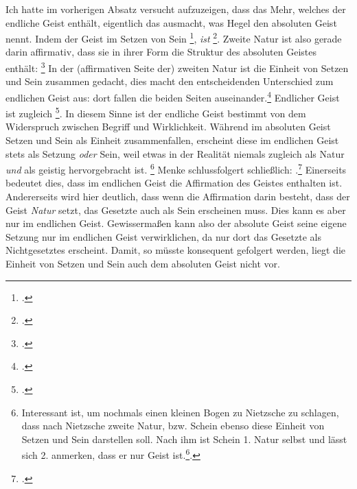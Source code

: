 \documentclass[12pt, a4paper, openany]{report}
\begin{document}
Ich hatte im vorherigen Absatz versucht aufzuzeigen, dass das Mehr, welches der endliche Geist enthält, eigentlich das ausmacht, was Hegel den absoluten Geist nennt.
Indem der Geist im Setzen von Sein \footcite[][§ 384, S. 29]{hegel_enzyklopädie_1969}, \emph{ist} \footcite[][144]{menke_autonomie_2018}.
Zweite Natur ist also gerade darin affirmativ, dass sie in ihrer Form die Struktur des absoluten Geistes enthält: 
\footcite[][§ 385 Z, S. 34]{hegel_enzyklopädie_1969}
In der (affirmativen Seite der) zweiten Natur ist die Einheit von Setzen und Sein zusammen gedacht, dies macht den entscheidenden Unterschied zum endlichen Geist aus: 
dort fallen die beiden Seiten auseinander.\footcite[Vgl.][S. 143 - S. 144]{menke_autonomie_2018}
Endlicher Geist ist zugleich \footcite[][144]{menke_autonomie_2018}.
In diesem Sinne ist der endliche Geist bestimmt von dem Widerspruch zwischen Begriff und Wirklichkeit. 
Während im absoluten Geist Setzen und Sein als Einheit zusammenfallen, erscheint diese im endlichen Geist stets als Setzung \emph{oder} Sein, weil etwas in der Realität niemals zugleich als Natur \emph{und} als geistig hervorgebracht ist.%
\footnote{
    Interessant ist, um nochmals einen kleinen Bogen zu Nietzsche zu schlagen, dass nach Nietzsche zweite Natur, bzw. Schein ebenso diese Einheit von Setzen und Sein darstellen soll.
    Nach ihm ist Schein 1. Natur selbst und lässt sich 2. anmerken, dass er nur Geist ist.\footcite[Vgl.][S. 417]{nietzsche_morgenrote_1999}. 
}
Menke schlussfolgert schließlich: 
.\footcite[][144]{menke_autonomie_2018}
Einerseits bedeutet dies, dass im endlichen Geist die Affirmation des Geistes enthalten ist.
Andererseits wird hier deutlich, dass wenn die Affirmation darin besteht, dass der Geist \emph{Natur} setzt, das Gesetzte auch als Sein erscheinen muss.
Dies kann es aber nur im endlichen Geist.
Gewissermaßen kann also der absolute Geist seine eigene Setzung nur im endlichen Geist verwirklichen, da nur dort das Gesetzte als Nichtgesetztes erscheint.
Damit, so müsste konsequent gefolgert werden, liegt die Einheit von Setzen und Sein auch dem absoluten Geist nicht vor. 
\end{document}
